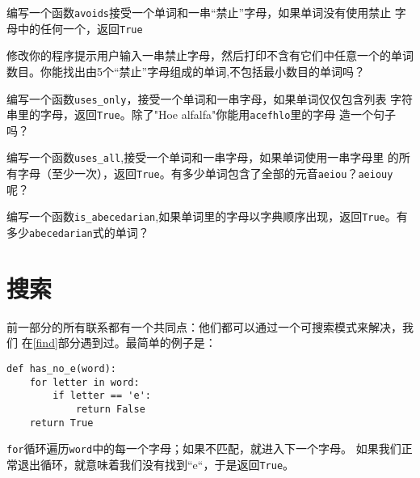 \begin{ex}

编写一个函数{\tt avoids}接受一个单词和一串“禁止”字母，如果单词没有使用禁止
字母中的任何一个，返回{\tt True}

修改你的程序提示用户输入一串禁止字母，然后打印不含有它们中任意一个的单词数目。你能找出由5个“禁止”字母组成的单词,不包括最小数目的单词吗？

\end{ex}

\begin{ex}
编写一个函数\verb"uses_only"，接受一个单词和一串字母，如果单词仅仅包含列表
字符串里的字母，返回{\tt True}。除了"Hoe alfalfa"你能用{\tt acefhlo}里的字母
造一个句子吗？
\end{ex}

\begin{ex}

编写一个函数\verb"uses_all",接受一个单词和一串字母，如果单词使用一串字母里
的所有字母（至少一次），返回{\tt True}。有多少单词包含了全部的元音{\tt aeiou}？{\tt aeiouy}呢？
\end{ex}


\begin{ex}
编写一个函数\verb"is_abecedarian",如果单词里的字母以字典顺序出现，返回{\tt True}。有多少{\tt abecedarian}式的单词？
\end{ex}


\section{搜索}







前一部分的所有联系都有一个共同点：他们都可以通过一个可搜索模式来解决，我们
在\ref{find}部分遇到过。最简单的例子是：

\beforeverb
\begin{verbatim}
def has_no_e(word):
    for letter in word:
        if letter == 'e':
            return False
    return True
\end{verbatim}
\afterverb

{\tt for}循环遍历{\tt word}中的每一个字母；如果不匹配，就进入下一个字母。
如果我们正常退出循环，就意味着我们没有找到“e“，于是返回{\tt True}。



